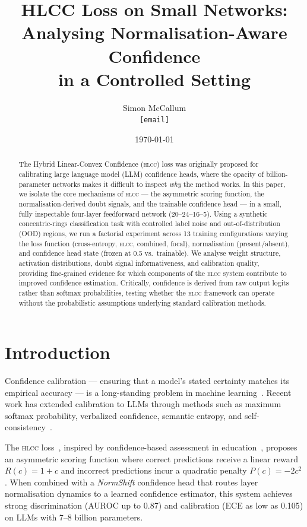 \documentclass[11pt,a4paper]{article}
\title{HLCC Loss on Small Networks:\\Analysing Normalisation-Aware Confidence\\in a Controlled Setting}
\author{
  Simon McCallum\\
  \texttt{[email]}
}
\date{\today}
\newcommand{\hlcc}{\textsc{hlcc}}
\begin{document}
\maketitle

\begin{abstract}
The Hybrid Linear-Convex Confidence (\hlcc{}) loss was originally proposed
for calibrating large language model (LLM) confidence heads, where the
opacity of billion-parameter networks makes it difficult to inspect
\emph{why} the method works.  In this paper, we isolate the core
mechanisms of \hlcc{} --- the asymmetric scoring function, the
normalisation-derived doubt signals, and the trainable confidence head
--- in a small, fully inspectable four-layer feedforward network
(20--24--16--5).  Using a synthetic concentric-rings classification task
with controlled label noise and out-of-distribution (OOD) regions, we
run a factorial experiment across 13 training configurations varying
the loss function (cross-entropy, \hlcc{}, combined, focal), normalisation
(present/absent), and confidence head state (frozen at 0.5 vs.\
trainable).  We analyse weight structure, activation distributions,
doubt signal informativeness, and calibration quality, providing
fine-grained evidence for which components of the \hlcc{} system
contribute to improved confidence estimation.  Critically, confidence
is derived from raw output logits rather than softmax probabilities,
testing whether the \hlcc{} framework can operate without the
probabilistic assumptions underlying standard calibration methods.
\end{abstract}

\section{Introduction}
\label{sec:intro}

Confidence calibration --- ensuring that a model's stated certainty
matches its empirical accuracy --- is a long-standing problem in
machine learning~\cite{guo2017calibration, naeini2015obtaining}.
Recent work has extended calibration to LLMs through methods such as
maximum softmax probability, verbalized confidence, semantic entropy,
and self-consistency~\cite{kadavath2022language, xiong2024llms,
kuhn2023semantic, wang2023selfconsistency}.

The \hlcc{} loss~\cite{mccallum2026hlcc}, inspired by confidence-based
assessment in education~\cite{mccallum2010gamedesign,
gardnermedwin1995}, proposes an asymmetric scoring function where
correct predictions receive a linear reward $R(c) = 1 + c$ and
incorrect predictions incur a quadratic penalty $P(c) = -2c^2$.  When
combined with a \emph{NormShift} confidence head that routes
layer normalisation dynamics to a learned confidence estimator, this
system achieves strong discrimination (AUROC up to 0.87) and
calibration (ECE as low as 0.105) on LLMs with 7--8 billion
parameters.
\end{document}
